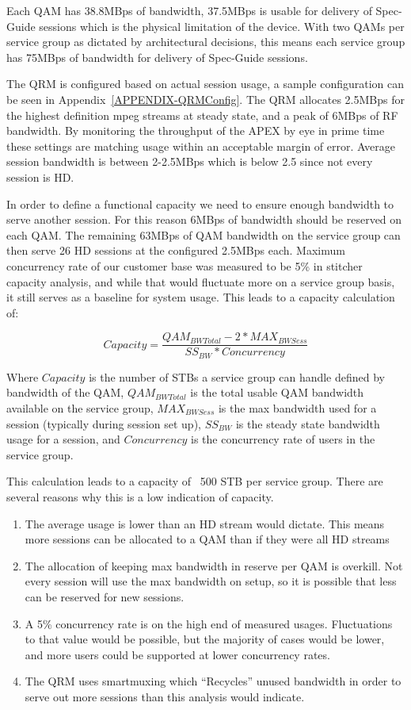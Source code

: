 \documentclass{article}
\begin{document}
Each QAM has 38.8MBps of bandwidth, 37.5MBps is usable for delivery of Spec-Guide sessions which is the physical limitation of the device. With two QAMs per service group as dictated by architectural decisions, this means each service group has 75MBps of bandwidth for delivery of Spec-Guide sessions. 

The QRM is configured based on actual session usage, a sample configuration can be seen in Appendix~\ref{APPENDIX-QRMConfig}. The QRM allocates 2.5MBps for the highest definition mpeg streams at steady state, and a peak of 6MBps of RF bandwidth. By monitoring the throughput of the APEX by eye in prime time these settings are matching usage within an acceptable margin of error. Average session bandwidth is between 2-2.5MBps which is below 2.5 since not every session is HD. 

In order to define a functional capacity we need to ensure enough bandwidth to serve another session. For this reason 6MBps of bandwidth should be reserved on each QAM. The remaining 63MBps of QAM bandwidth on the service group can then serve 26 HD sessions at the configured 2.5MBps each. Maximum concurrency rate of our customer base was measured to be 5\% in stitcher capacity analysis, and while that would fluctuate more on a service group basis, it still serves as a baseline for system usage. This leads to a capacity calculation of: 

$$Capacity=\frac{QAM_{BWTotal}-2*MAX_{BWSess}}{SS_{BW}*Concurrency}$$ 

Where $Capacity$ is the number of STBs a service group can handle defined by bandwidth of the QAM, $QAM_{BWTotal}$ is the total usable QAM bandwidth available on the service group, $MAX_{BWSess}$ is the max bandwidth used for a session (typically during session set up), $SS_{BW}$ is the steady state bandwidth usage for a session, and $Concurrency$ is the concurrency rate of users in the service group. 

This calculation leads to a capacity of ~500 STB per service group. There are several reasons why this is a low indication of capacity. 

\begin{enumerate}
\item The average usage is lower than an HD stream would dictate. This means more sessions can be allocated to a QAM than if they were all HD streams
\item The allocation of keeping max bandwidth in reserve per QAM is overkill. Not every session will use the max bandwidth on setup, so it is possible that less can be reserved for new sessions. 
\item A 5\% concurrency rate is on the high end of measured usages. Fluctuations to that value would be possible, but the majority of cases would be lower, and more users could be supported at lower concurrency rates. 
\item The QRM uses smartmuxing which ``Recycles'' unused bandwidth in order to serve out more sessions than this analysis would indicate. 
\end{enumerate}
 
\end{document}
